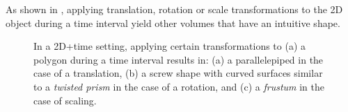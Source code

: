 As shown in , applying translation, rotation or scale transformations to the 2D object during a time interval yield other volumes that have an intuitive shape.
\begin{figure}[b]
\centering
{}
\caption[Object transformations in 2D space+time]{In a 2D+time setting, applying certain transformations to (a) a polygon during a time interval results in: (a) a parallelepiped in the case of a translation, (b) a screw shape with curved surfaces similar to a \emph{twisted prism} in the case of a rotation, and (c) a \emph{frustum} in the case of scaling.}
\label{fig:aula-transformations}
\end{figure}

